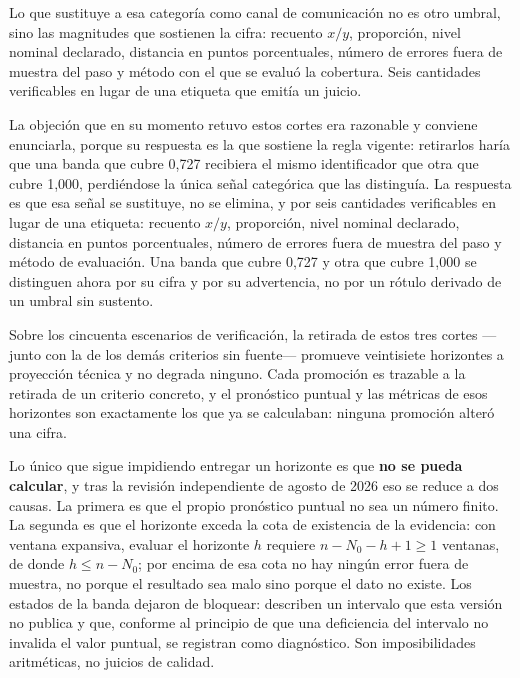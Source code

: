 \documentclass[12pt,letterpaper]{article}
\begin{document}
Lo que sustituye a esa categoría como canal de comunicación no es otro umbral, sino las magnitudes que sostienen la cifra: recuento \(x/y\), proporción, nivel nominal declarado, distancia en puntos porcentuales, número de errores fuera de muestra del paso y método con el que se evaluó la cobertura. Seis cantidades verificables en lugar de una etiqueta que emitía un juicio.

La objeción que en su momento retuvo estos cortes era razonable y conviene enunciarla, porque su respuesta es la que sostiene la regla vigente: retirarlos haría que una banda que cubre 0,727 recibiera el mismo identificador que otra que cubre 1,000, perdiéndose la única señal categórica que las distinguía. La respuesta es que esa señal se sustituye, no se elimina, y por seis cantidades verificables en lugar de una etiqueta: recuento \(x/y\), proporción, nivel nominal declarado, distancia en puntos porcentuales, número de errores fuera de muestra del paso y método de evaluación. Una banda que cubre 0,727 y otra que cubre 1,000 se distinguen ahora por su cifra y por su advertencia, no por un rótulo derivado de un umbral sin sustento.

Sobre los cincuenta escenarios de verificación, la retirada de estos tres cortes ---junto con la de los demás criterios sin fuente--- promueve veintisiete horizontes a proyección técnica y no degrada ninguno. Cada promoción es trazable a la retirada de un criterio concreto, y el pronóstico puntual y las métricas de esos horizontes son exactamente los que ya se calculaban: ninguna promoción alteró una cifra.

Lo único que sigue impidiendo entregar un horizonte es que \textbf{no se pueda calcular}, y tras la revisión independiente de agosto de 2026 eso se reduce a dos causas. La primera es que el propio pronóstico puntual no sea un número finito. La segunda es que el horizonte exceda la cota de existencia de la evidencia: con ventana expansiva, evaluar el horizonte \(h\) requiere \(n-N_0-h+1\ge 1\) ventanas, de donde \(h\le n-N_0\); por encima de esa cota no hay ningún error fuera de muestra, no porque el resultado sea malo sino porque el dato no existe. Los estados de la banda dejaron de bloquear: describen un intervalo que esta versión no publica y que, conforme al principio de que una deficiencia del intervalo no invalida el valor puntual, se registran como diagnóstico. Son imposibilidades aritméticas, no juicios de calidad.
\end{document}
